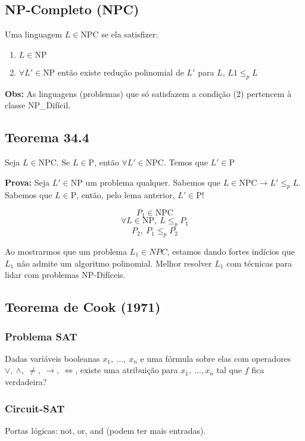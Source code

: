 \documentclass[a4paper,oneside,article,table]{article}
\begin{document}
        \subsection{NP-Completo (NPC)}
        Uma linguagem $L \in \textrm{NPC}$ se ela satisfizer:
        \begin{enumerate}
            \item $L \in \textrm{NP}$
            \item $\forall L' \in \textrm{NP}$ então existe redução polinomial de $L'$ para $L$, $L1 {\leq}_p L$
        \end{enumerate}

        \textbf{Obs:} As linguagens (problemas) que só satisfazem a condição (2) pertencem à classe NP_Difícil.

        \subsection{Teorema 34.4} Seja $L \in \textrm{NPC}$. Se $L \in \textrm{P}$, então $\forall L' \in \textrm{NPC}$. Temos que $L' \in \textrm{P}$

        \textbf{Prova:} Seja $L' \in \textrm{NP}$ um problema qualquer. Sabemos que $L \in \textrm{NPC} \rightarrow L' {\leq}_p L$.\\
        Sabemos que $L \in \textrm{P}$, então, pelo lema anterior, $L' \in \textrm{P}$! 

        \[P_1 \in \textrm{NPC}\]
        \[\forall L \in \textrm{NP},~L {\leq}_p P_1\]
        \[P_2,~P_1 {\leq}_p P_2\]

        Ao mostrarmos que um problema $L_1 \in NPC$, estamos dando fortes indícios que $L_1$ não admite um algoritmo polinomial.
        Melhor resolver $L_1$ com técnicas para lidar com problemas NP-Difíceis.

        \subsection{Teorema de Cook (1971)}
            \subsubsection{Problema SAT}
                Dadas variáveis booleanas $x_1,~\ldots,~x_n$ e uma fórmula sobre elas com operadores $\lor,~\land,~\ne,~\rightarrow,~\iff$, existe uma atribuição para $x_1,~\ldots, x_n$ tal que $f$ fica verdadeira?

            \subsubsection{Circuit-SAT}
            Portas lógicas: not, or, and (podem ter mais entradas).
\end{document}
